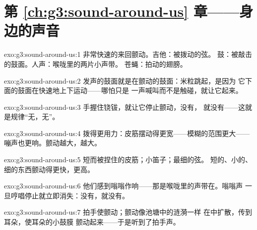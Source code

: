 \section*{第 \ref{ch:g3:sound-around-us} 章——身边的声音}

\begin{solution}{exo:g3:sound-around-us:1}
非常快速的来回颤动。吉他：被拨动的弦。
鼓：被敲击的鼓面。人声：喉咙里的两片小声带。
苍蝇：拍动的翅膀。
\end{solution}

\begin{solution}{exo:g3:sound-around-us:2}
发声的鼓面就是在颤动的鼓面：米粒跳起，是因为
它下面的鼓面在快速地上下运动——哪怕只是
一声喊叫而不是触碰，就让它起来。
\end{solution}

\begin{solution}{exo:g3:sound-around-us:3}
手握住铙钹，就让它停止颤动，没有，
就没有——这就是规律“无，无”。
\end{solution}

\begin{solution}{exo:g3:sound-around-us:4}
拨得更用力：皮筋摆动得更宽——模糊的范围更大——
嘣声也更响。颤动越大，越大。
\end{solution}

\begin{solution}{exo:g3:sound-around-us:5}
短而被捏住的皮筋；小笛子；最细的弦。
短的、小的、细的东西颤动得更快，更高。
\end{solution}

\begin{solution}{exo:g3:sound-around-us:6}
他们感到嗡嗡作响——那是喉咙里的声带在。嗡嗡声
一旦哼唱停止就立即消失：没有，就没有。
\end{solution}

\begin{solution}{exo:g3:sound-around-us:7}
拍手使颤动；颤动像池塘中的涟漪一样
在中扩散，传到耳朵，使耳朵的小鼓膜
颤动起来——于是听到了拍手声。
\end{solution}

